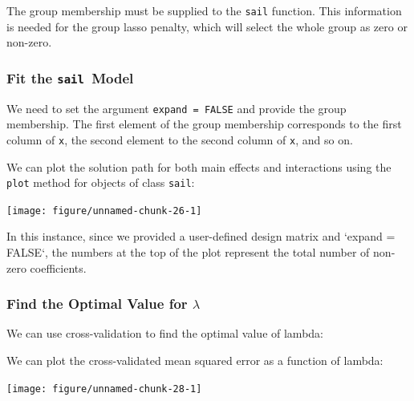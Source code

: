 \documentclass[12pt,letter]{article}\usepackage[]{graphicx}\usepackage[]{color}
\newenvironment{knitrout}{}{} %
\newcommand{\sail}{\texttt{sail}}
\begin{document}
The group membership must be supplied to the \texttt{sail} function. This information is needed for the group lasso penalty, which will select the whole group as zero or non-zero.

\subsubsection{Fit the \sail ~Model}

We need to set the argument \texttt{expand = FALSE} and provide the group membership. The first element of the group membership corresponds to the first column of \texttt{x}, the second element to the second column of \texttt{x}, and so on. 



We can plot the solution path for both main effects and interactions using the \texttt{plot} method for objects of class \texttt{sail}:

\begin{knitrout}\scriptsize
{}\color{fgcolor}

{\centering \texttt{[image: figure/unnamed-chunk-26-1]} 

}



\end{knitrout}

In this instance, since we provided a user-defined design matrix and `expand = FALSE`, the numbers at the top of the plot represent the total number of non-zero coefficients. 


\subsubsection{Find the Optimal Value for $\lambda$}

We can use cross-validation to find the optimal value of lambda:



We can plot the cross-validated mean squared error as a function of lambda:

\begin{knitrout}\scriptsize
{}\color{fgcolor}

{\centering \texttt{[image: figure/unnamed-chunk-28-1]} 

}



\end{knitrout}
\end{document}
